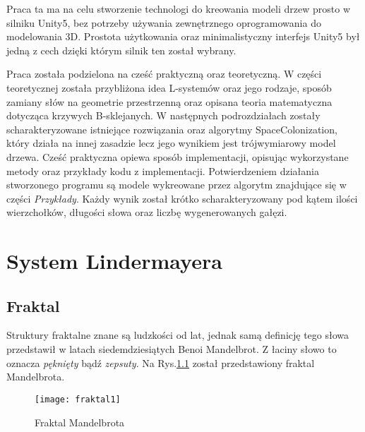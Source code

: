 \documentclass[12pt]{report}
\renewcommand{\figurename}{Rys.}
\begin{document}
\begin{sloppypar}
Praca ta ma na celu stworzenie technologi do kreowania modeli drzew prosto w silniku Unity5, bez potrzeby używania zewnętrznego oprogramowania do modelowania 3D. Prostota użytkowania oraz minimalistyczny interfejs Unity5 był jedną z cech dzięki którym silnik ten został wybrany.

Praca została podzielona na cześć praktyczną oraz teoretyczną. W części teoretycznej została przybliżona idea L-systemów oraz jego rodzaje, sposób zamiany słów na geometrie przestrzenną oraz opisana teoria matematyczna dotycząca krzywych B-sklejanych. W następnych podrozdziałach zostały scharakteryzowane istniejące rozwiązania oraz algorytmy SpaceColonization, który działa na innej zasadzie lecz jego wynikiem jest trójwymiarowy model drzewa.
Cześć praktyczna opiewa sposób implementacji, opisując wykorzystane metody oraz przykłady kodu z implementacji. Potwierdzeniem działania stworzonego programu są modele wykreowane przez algorytm znajdujące się w części \textit{Przykłady}. Każdy wynik został krótko scharakteryzowany pod kątem ilości wierzchołków, długości słowa oraz liczbę wygenerowanych gałęzi.

\chapter{System Lindermayera} \label{rozdz.L-system} 

\section{Fraktal}
Struktury fraktalne znane są ludzkości od lat, jednak samą definicję tego słowa przedstawił w latach siedemdziesiątych Benoi Mandelbrot. Z łaciny słowo to oznacza \textit{pęknięty} bądź \textit{zepsuty}. Na \figurename\ref{fig:fraktal1} został przedstawiony fraktal Mandelbrota.

\begin{figure}[!htb]
\centering
\texttt{[image: fraktal1]} 
\caption{Fraktal Mandelbrota \label{fig:fraktal1}}

\end{figure}



\end{sloppypar}
\end{document}
